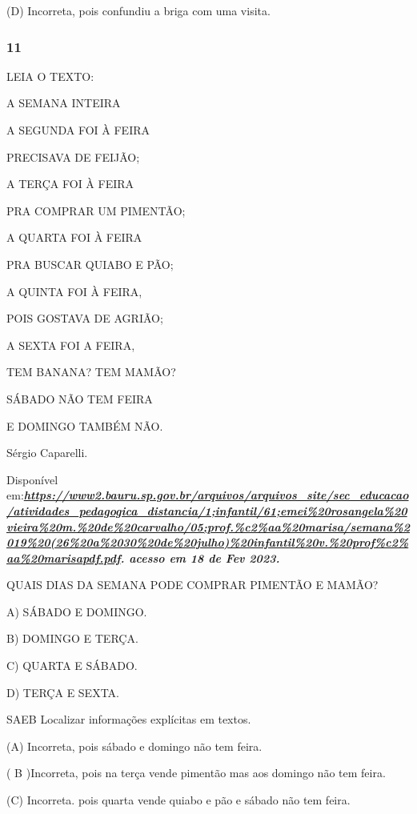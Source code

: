 \begin{escola}
(D) Incorreta, pois confundiu a briga com uma visita.

\subsubsection{11}\label{section-36}

LEIA O TEXTO:

A SEMANA INTEIRA

A SEGUNDA FOI À FEIRA

PRECISAVA DE FEIJÃO;

A TERÇA FOI À FEIRA

PRA COMPRAR UM PIMENTÃO;

A QUARTA FOI À FEIRA

PRA BUSCAR QUIABO E PÃO;

A QUINTA FOI À FEIRA,

POIS GOSTAVA DE AGRIÃO;

A SEXTA FOI A FEIRA,

TEM BANANA? TEM MAMÃO?

SÁBADO NÃO TEM FEIRA

E DOMINGO TAMBÉM NÃO.

Sérgio Caparelli.

Disponível
em:\textbf{\emph{\href{https://www2.bauru.sp.gov.br/arquivos/arquivos_site/sec_educacao/atividades_pedagogica_distancia/1;Infantil/61;EMEI\%20Rosangela\%20Vieira\%20M.\%20de\%20Carvalho/05;PROF.\%C2\%AA\%20MARISA/Semana\%2019\%20(26\%20a\%2030\%20de\%20Julho)\%20Infantil\%20V.\%20Prof\%C2\%AA\%20Marisapdf.pdf}{https://www2.bauru.sp.gov.br/arquivos/arquivos\_site/sec\_educacao/atividades\_pedagogica\_distancia/1;infantil/61;emei\%20rosangela\%20vieira\%20m.\%20de\%20carvalho/05;prof.\%c2\%aa\%20marisa/semana\%2019\%20(26\%20a\%2030\%20de\%20julho)\%20infantil\%20v.\%20prof\%c2\%aa\%20marisapdf.pdf}.
acesso em 18 de Fev 2023.}}

QUAIS DIAS DA SEMANA PODE COMPRAR PIMENTÃO E MAMÃO?

A) SÁBADO E DOMINGO.

B) DOMINGO E TERÇA.

C) QUARTA E SÁBADO.

D) TERÇA E SEXTA.

SAEB Localizar informações explícitas em textos.

(A) Incorreta, pois sábado e domingo não tem feira.

( B )Incorreta, pois na terça vende pimentão mas aos domingo não tem
feira.

(C) Incorreta. pois quarta vende quiabo e pão e sábado não tem feira.


\end{escola}
